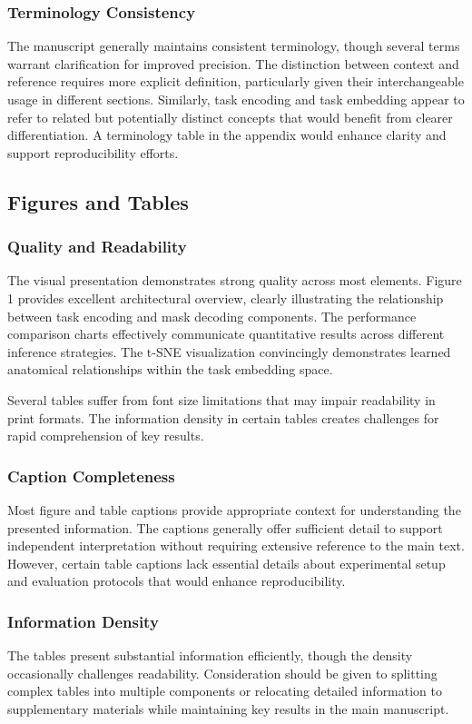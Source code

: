 \subsubsection{Terminology Consistency}
The manuscript generally maintains consistent terminology, though several terms warrant clarification for improved precision. The distinction between context and reference requires more explicit definition, particularly given their interchangeable usage in different sections. Similarly, task encoding and task embedding appear to refer to related but potentially distinct concepts that would benefit from clearer differentiation. A terminology table in the appendix would enhance clarity and support reproducibility efforts.

\subsection{Figures and Tables}
\subsubsection{Quality and Readability}
The visual presentation demonstrates strong quality across most elements. Figure 1 provides excellent architectural overview, clearly illustrating the relationship between task encoding and mask decoding components. The performance comparison charts effectively communicate quantitative results across different inference strategies. The t-SNE visualization convincingly demonstrates learned anatomical relationships within the task embedding space.

Several tables suffer from font size limitations that may impair readability in print formats. The information density in certain tables creates challenges for rapid comprehension of key results.

\subsubsection{Caption Completeness}
Most figure and table captions provide appropriate context for understanding the presented information. The captions generally offer sufficient detail to support independent interpretation without requiring extensive reference to the main text. However, certain table captions lack essential details about experimental setup and evaluation protocols that would enhance reproducibility.

\subsubsection{Information Density}
The tables present substantial information efficiently, though the density occasionally challenges readability. Consideration should be given to splitting complex tables into multiple components or relocating detailed information to supplementary materials while maintaining key results in the main manuscript.

